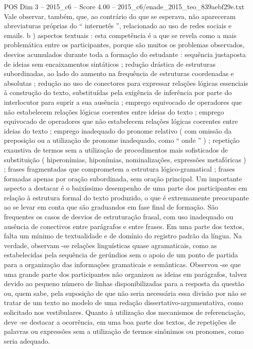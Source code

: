 \begin{textsample}{POS Dim 3 – 2015\_c6 – Score 4.00 – 2015\_c6/enade\_2015\_teo\_839aebf29e.txt}
Vale observar, também, que, ao contrário do que se esperava, não apareceram abreviaturas próprias do “ internetês ”, relacionado ao uso de redes sociais e emails. b ) aspectos textuais : esta competência é a que se revela como a mais problemática entre os participantes, porque são muitos os problemas observados, desvios acumulados durante toda a formação do estudante : sequência justaposta de ideias sem encaixamentos sintáticos ; redução drástica de estruturas subordinadas, ao lado do aumento na frequência de estruturas coordenadas e absolutas ; redução no uso de conectores para expressar relações lógicas essenciais à construção do texto, substituídas pela exigência de inferência por parte do interlocutor para suprir a sua ausência ; emprego equivocado de operadores que não estabelecem relações lógicas coerentes entre ideias do texto ; emprego equivocado de operadores que não estabelecem relações lógicas coerentes entre ideias do texto ; emprego inadequado do pronome relativo ( com omissão da preposição ou a utilização de pronome inadequado, como “ onde ” ) ; repetição exaustiva de termos sem a utilização de procedimentos mais sofisticados de substituição ( hiperonímias, hiponímias, nominalizações, expressões metafóricas ) ; frases fragmentadas que comprometem a estrutura lógico-gramatical ; frases formadas apenas por oração subordinada, sem oração principal.
Um importante aspecto a destacar é o baixíssimo desempenho de uma parte dos participantes em relação à estrutura formal do texto produzido, o que é extremamente preocupante ao se levar em conta que são graduandos em fase final de formação.
São frequentes os casos de desvios de estruturação frasal, com uso inadequado ou ausência de conectivos entre parágrafos e entre frases.
Em uma parte dos textos, falta um mínimo de textualidade e de domínio do registro padrão da língua.
Na verdade, observam -se relações linguísticas quase agramaticais, como as estabelecidas pela sequência de gerúndios sem o apoio de um ponto de partida para a organização das informações gramaticais e semânticas.
Observou -se que uma grande parte dos participantes não organizou as ideias em parágrafos, talvez devido ao pequeno número de linhas disponibilizadas para a resposta da questão ou, quem sabe, pela suposição de que não seria necessária essa divisão por não se tratar de um texto no modelo de uma redação dissertativo-argumentativa, como solicitado nos vestibulares.
Quanto à utilização dos mecanismos de referenciação, deve -se destacar a ocorrência, em uma boa parte dos textos, de repetições de palavras ou expressões sem a utilização de termos sinônimos ou pronomes, como seria adequado.

\end{textsample}

